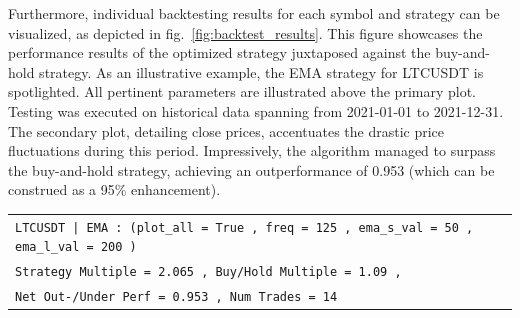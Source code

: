 Furthermore, individual backtesting results for each symbol and strategy can be visualized, as depicted in fig.~\ref{fig:backtest_results}.
This figure showcases the performance results of the optimized strategy juxtaposed against the buy-and-hold strategy.
As an illustrative example, the EMA strategy for LTCUSDT is spotlighted. All pertinent parameters are illustrated above the primary plot.
Testing was executed on historical data spanning from 2021-01-01 to 2021-12-31.
The secondary plot, detailing close prices, accentuates the drastic price fluctuations during this period.
 Impressively, the algorithm managed to surpass the buy-and-hold strategy, achieving an outperformance of 0.953 (which can be construed as a 95\% enhancement).

\begin{table}[ht!]
    \centering
    \begin{tabular}{l}
        \texttt{LTCUSDT | EMA : (plot\_all = True , freq = 125 , ema\_s\_val = 50 , ema\_l\_val = 200 )} \\
        \texttt{Strategy Multiple = 2.065 , Buy/Hold Multiple = 1.09 ,} \\
        \texttt{Net Out-/Under Perf = 0.953 , Num Trades = 14} \\
    \end{tabular}
\end{table}



